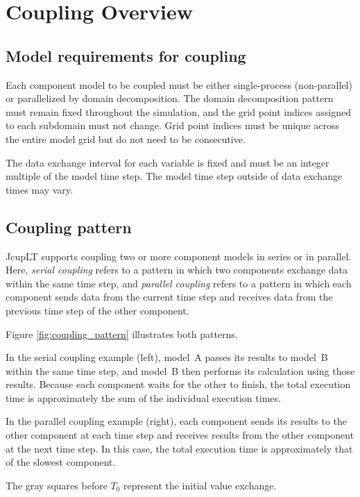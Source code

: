 \documentclass[11pt,a4paper]{report}
\newcommand{\figref}[1]{Figure \ref{#1}}
\begin{document}
\section{Coupling Overview}

\subsection{Model requirements for coupling}

Each component model to be coupled must be either single-process (non-parallel)
or parallelized by domain decomposition.
The domain decomposition pattern must remain fixed throughout the simulation,
and the grid point indices assigned to each subdomain must not change.
Grid point indices must be unique across the entire model grid
but do not need to be consecutive.

The data exchange interval for each variable is fixed
and must be an integer multiple of the model time step.
The model time step outside of data exchange times may vary.

\subsection{Coupling pattern}

JcupLT supports coupling two or more component models
in series or in parallel.
Here, \emph{serial coupling} refers to a pattern
in which two components exchange data within the same time step,
and \emph{parallel coupling} refers to a pattern
in which each component sends data from the current time step
and receives data from the previous time step of the other component.

\figref{fig:coupling_pattern} illustrates both patterns.

In the serial coupling example (left),
model~A passes its results to model~B within the same time step,
and model~B then performs its calculation using those results.
Because each component waits for the other to finish,
the total execution time is approximately the sum
of the individual execution times.

In the parallel coupling example (right),
each component sends its results to the other component at each time step
and receives results from the other component at the next time step.
In this case, the total execution time is approximately
that of the slowest component.

The gray squares before $T_0$ represent the initial value exchange.
\end{document}

